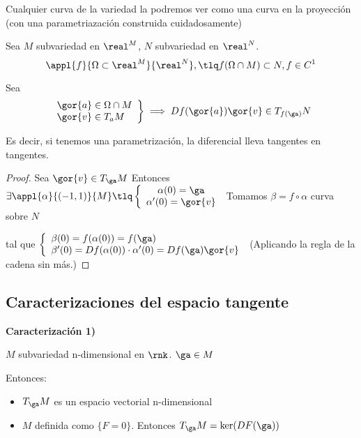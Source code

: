 \obs Cualquier curva de la variedad la podremos ver como una curva en la proyección (con una parametriazación construida cuidadosamente)

\begin{theorem}
Sea $M$ subvariedad en $\real^M$, $N$ subvariedad en $\real^N$.
\[\appl{f}{\Omega\subset\real^M}{\real^N}, \tlq f(\Omega\cap M) \subset N, f\in C^1\]

Sea \[\left.\begin{array}{lc}
\gor{a} \in \Omega\cap M \\ 
\gor{v} \in T_aM
\end{array}\right\} 
\implies Df(\gor{a})\gor{v} \in T_{f(\ga)}N\]
\end{theorem}

Es decir, si tenemos una parametrización, la diferencial lleva tangentes en tangentes.

\begin{proof}
Sea $\gor{v} \in T_{\ga} M$
Entonces $\exists \appl{\alpha}{(-1,1)}{M} \tlq \left\{\begin{array}{c}
\alpha(0) = \ga\\
\alpha'(0) = \gor{v}
\end{array}\right.$
Tomamos $\beta = f \circ \alpha$ curva sobre $N$ 

tal que $\left\{\begin{array}{lc} \beta(0) = f(\alpha(0)) = f(\ga)\\ 
\beta'(0) = Df(\alpha(0))\cdot \alpha'(0) = Df(\ga)\gor{v}\end{array}\right.$ (Aplicando la regla de la cadena sin más.)
\end{proof}


\subsection{Caracterizaciones del espacio tangente}
\textbf{Caracterización 1)}
\begin{theorem}

$M$ subvariedad n-dimensional en $\rnk$. $\ga \in M$

Entonces:

\begin{itemize}
\item $T_{\ga}M$ es un espacio vectorial n-dimensional
\item $M$ definida como $\{F = 0\}$. Entonces $T_{\ga} M = \ker(DF(\ga))$
\end{itemize}
\end{theorem}


